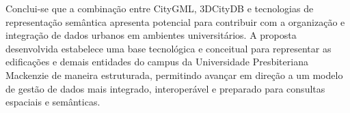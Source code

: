 \documentclass[
  article,   %
  11pt,      %
  oneside,   %
  a4paper,   %
  english,   %
  brazil,    %
  sumario=tradicional
]{abntex2}
\begin{document}
Conclui-se que a combinação entre CityGML, 3DCityDB e tecnologias de representação semântica
apresenta potencial para contribuir com a organização e integração de dados urbanos em ambientes
universitários.
A proposta desenvolvida estabelece uma base tecnológica e conceitual para representar as
edificações e demais entidades do campus da Universidade Presbiteriana Mackenzie de maneira
estruturada, permitindo avançar em direção a um modelo de gestão de dados mais integrado,
interoperável e preparado para consultas espaciais e semânticas.


\postextual



\end{document}
